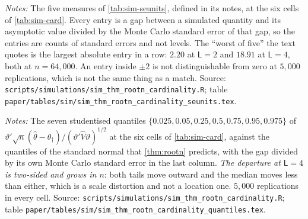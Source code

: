 \documentclass[
  12pt]{article}
\newcommand{\1}[1]{\mathds{1}\left[#1\right]}
\theoremstyle{plain}
\theoremstyle{definition}
\theoremstyle{definition}
\theoremstyle{remark}
\begin{document}
\begin{table}[!htbp]
\centering
\begin{threeparttable}
\caption{The same six cells in Monte Carlo standard error units}
\label{tab:sim-card-se}
\footnotesize

\begin{tablenotes}\footnotesize
\item \textit{Notes:} The five measures of \cref{tab:sim-seunits}, defined in its
notes, at the six cells of \cref{tab:sim-card}. Every entry is a gap between a
simulated quantity and its asymptotic value divided by the Monte Carlo standard
error of that gap, so the entries are counts of standard errors and not levels.
The ``worst of five'' the text quotes is the largest absolute entry in a row:
$2.20$ at $\mathsf L=2$ and $18.91$ at $\mathsf L=4$, both at $n=64{,}000$. An
entry inside $\pm2$ is not distinguishable from zero at $5{,}000$ replications,
which is not the same thing as a match. Source:
\texttt{scripts/simulations/sim\_thm\_rootn\_cardinality.R}; table
\texttt{paper/tables/sim/sim\_thm\_rootn\_cardinality\_seunits.tex}.
\end{tablenotes}
\end{threeparttable}
\end{table}

\begin{table}[p]
\centering
\begin{threeparttable}
\caption{Studentised quantiles at the two cardinalities}
\label{tab:sim-card-q}
\scriptsize

\begin{tablenotes}\footnotesize
\item \textit{Notes:} The seven studentised quantiles
$\{0.025,0.05,0.25,0.5,0.75,0.95,0.975\}$ of
$\vartheta'\sqrt n(\hat\theta-\theta_\dagger)/(\vartheta'\hat V\vartheta)^{1/2}$
at the six cells of \cref{tab:sim-card}, against the quantiles of the standard
normal that \cref{thm:rootn} predicts, with the gap divided by its own Monte
Carlo standard error in the last column. \emph{The departure at $\mathsf L=4$ is
two-sided and grows in $n$}: both tails move outward and the median moves less
than either, which is a scale distortion and not a location one. $5{,}000$
replications in every cell. Source:
\texttt{scripts/simulations/sim\_thm\_rootn\_cardinality.R}; table
\texttt{paper/tables/sim/sim\_thm\_rootn\_cardinality\_quantiles.tex}.
\end{tablenotes}
\end{threeparttable}
\end{table}
\end{document}
